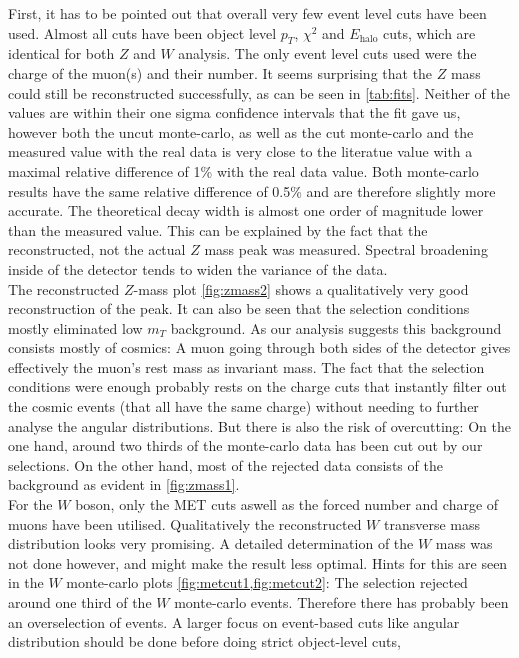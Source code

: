 \documentclass[twoside,        %
               BCOR12mm,       %
               ngerman,english, %
               fleqn,headsepline=false,footsepline=false
              ]{Vorlage/MFPREPORT}
\begin{document}
First, it has to be pointed out that overall very few event level cuts have
been used. Almost all cuts have been object level $p_T$, $\chi^2$ and
$E_\text{halo}$ cuts, which are identical for both $Z$ and $W$ analysis.
The only event level cuts used were the charge of the muon(s) and their number.
It seems surprising that the $Z$ mass could still be reconstructed
successfully, as can be seen in \cref{tab:fits}. Neither of the values are
within their one sigma confidence intervals that the fit gave us, however both
the uncut monte-carlo, as well as the cut monte-carlo and the measured value
with the real data is very close to the literatue value with a maximal relative
difference of 1\% with the real data value. Both monte-carlo results have the
same relative difference of 0.5\% and are therefore slightly more accurate.
The theoretical decay width is almost one order of magnitude lower than the
measured value. This can be explained by the fact that the reconstructed, not
the actual $Z$ mass peak was measured. Spectral broadening inside of the
detector tends to widen the variance of the data.\\ The reconstructed $Z$-mass plot \cref{fig:zmass2} shows a qualitatively very
good  reconstruction of the peak. It can also be seen that the selection
conditions mostly eliminated low $m_T$ background. As our analysis suggests
this background consists mostly of cosmics: A muon going through both sides of
the detector gives effectively the muon's rest mass as invariant mass.
The fact that the selection conditions were enough probably rests on the charge
cuts that instantly filter out the cosmic events (that all have the same
charge) without needing to further analyse the angular distributions.
But there is also the risk of overcutting: On the one hand, around two thirds
of the monte-carlo data has been cut out by our selections. On the other hand,
most of the rejected data consists of the background as evident in
\cref{fig:zmass1}.\\
For the $W$ boson, only the MET cuts aswell as the forced number and charge of
muons have been utilised. Qualitatively the reconstructed $W$ transverse mass
distribution looks very promising. A detailed determination of the $W$ mass was
not done however, and might make the result less optimal. Hints for this are
seen in the $W$ monte-carlo plots \cref{fig:metcut1,fig:metcut2}: The selection
rejected around one third of the $W$ monte-carlo events. Therefore there has
probably been an overselection of events. A larger focus on event-based cuts
like angular distribution should be done before doing strict object-level cuts,
\end{document}
